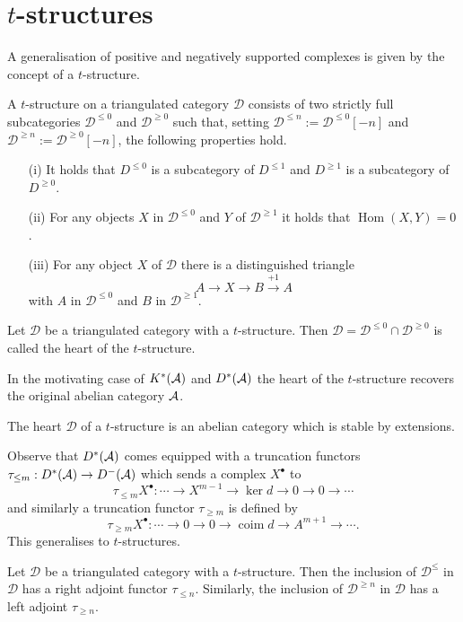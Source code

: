 \section{$t$-structures}
A generalisation of positive and negatively supported complexes is given by the concept of a $t$-structure.
\begin{definition}
 A $t$-structure on a triangulated category $\mathcal{D}$ consists of two strictly full subcategories $\mathcal{D}^{\leq 0}$ and $\mathcal{D}^{\geq 0}$ such that, setting $\mathcal{D}^{\leq n} := \mathcal{D}^{\leq 0}[-n]$ and $\mathcal{D}^{\geq n} := \mathcal{D}^{\geq 0} [-n]$, the following properties hold.
 \begin{enumerate}
   \item[(i)] It holds that $D^{\leq 0}$ is a subcategory of $D^{\leq 1}$ and $D^{\geq 1}$ is a subcategory of $D^{\geq 0}$.
   \item[(ii)] For any objects $X$ in $\mathcal{D}^{\leq 0}$ and $Y$ of $\mathcal{D}^{\geq 1}$ it holds that $\operatorname{Hom}(X,Y) = 0$.
   \item[(iii)] For any object $X$ of $\mathcal{D}$ there is a distinguished triangle
   $$A \to X \to B \xrightarrow{+1} A $$
   with $A$ in $\mathcal{D}^{\leq 0}$ and $B$ in $\mathcal{D}^{\geq 1}$.
 \end{enumerate}
\end{definition}
\begin{definition}
 Let $\mathcal{D}$ be a triangulated category with a $t$-structure. Then $\mathcal{D} = \mathcal{D}^{\leq 0} \cap \mathcal{D}^{\geq 0}$ is called the heart of the $t$-structure.
\end{definition}
In the motivating case of $K^*(\AA)$ and $D^*(\AA)$ the heart of the $t$-structure recovers the original abelian category $\AA$.
\begin{proposition}
 The heart $\mathcal{D}$ of a $t$-structure is an abelian category which is stable by extensions.
\end{proposition}
Observe that $D^*(\AA)$ comes equipped with a truncation functors
$\tau_{\leq m}:D^*(\AA)\to D^-(\AA)$ which sends a complex $X^\bullet$ to
$$\tau_{\leq m}X^\bullet : \cdots \to X^{m-1} \to \ker d \to 0 \to 0 \to \cdots$$
and similarly a truncation functor $\tau_{\geq m}$ is defined by
$$\tau_{\geq m}X^\bullet: \cdots \to 0 \to 0 \to \operatorname{coim} d \to A^{m+1}\to \cdots.$$
This generalises to $t$-structures.
\begin{proposition}
 Let $\mathcal{D}$ be a triangulated category with a $t$-structure.
 Then the inclusion of $\mathcal{D}^{\leq}$ in $\mathcal{D}$ has a right adjoint functor $\tau_{\leq n}$.
 Similarly, the inclusion of $\mathcal{D}^{\geq n}$ in $\mathcal{D}$ has a left adjoint $\tau_{\geq n}$.
\end{proposition}
